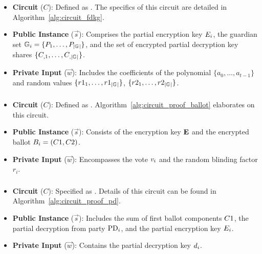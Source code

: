 \documentclass[runningheads]{llncs}
\begin{document}
\subsubsection{}\label{sec:proof-fdkg}

\begin{itemize}
    \item \textbf{Circuit} ($C$): Defined as \ProofFDKGInformal{}. The specifics of this circuit are detailed in Algorithm~\ref{alg:circuit_fdkg}.
    \item \textbf{Public Instance} ($\vec{s}$): Comprises the partial encryption key $E_{i}$, the guardian set $\mathbb{G}_{i} = \{P_{1},\dots,P_{|\mathbb{G}_{}|}\}$, and the set of encrypted partial decryption key shares $\{C_{,1},\dots, C_{,|\mathbb{G}_{}|}\}$.
    \item \textbf{Private Input} ($\vec{w}$): Includes the coefficients of the polynomial $\{a_0, \dots, a_{t-1}\}$ and random values $\{r1_1,\dots,r1_{|\mathbb{G}_{}|}\}$, $\{r2_1,\dots,r2_{|\mathbb{G}_{}|}\}$.
\end{itemize}

\subsubsection{}\label{sec:proof-ballot}

\begin{itemize}
    \item \textbf{Circuit} ($C$): Defined as \ProofBALLOTInformal{}. Algorithm~\ref{alg:circuit_proof_ballot} elaborates on this circuit.
    \item \textbf{Public Instance} ($\vec{s}$): Consists of the encryption key $\textbf{E}{}$ and the encrypted ballot $B_{i} = (C1, C2)$.
    \item \textbf{Private Input} ($\vec{w}$): Encompasses the vote $v_{i}$ and the random blinding factor $r_i$.
\end{itemize}

\subsubsection{}\label{sec:proof-pd}

\begin{itemize}
    \item \textbf{Circuit} ($C$): Specified as \ProofPDInformal{}. Details of this circuit can be found in Algorithm~\ref{alg:circuit_proof_pd}.
    \item \textbf{Public Instance} ($\vec{s}$): Includes the sum of first ballot components $C1{}$, the partial decryption from party $\mathrm{PD}_{i}$, and the partial encryption key $E_{i}$.
    \item \textbf{Private Input} ($\vec{w}$): Contains the partial decryption key $d_{i}$.
\end{itemize}
\end{document}
